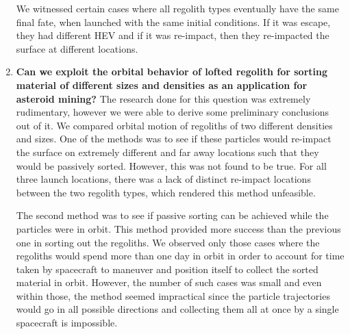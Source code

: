 \begin{enumerate}
We witnessed certain cases where all regolith types eventually have the same final fate, when launched with the same initial conditions. If it was escape, they had different \gls{HEV} and if it was re-impact, then they re-impacted the surface at different locations.

\item \textbf{Can we exploit the orbital behavior of lofted regolith for sorting material of different sizes and densities as an application for asteroid mining?}\newline
The research done for this question was extremely rudimentary, however we were able to derive some preliminary conclusions out of it. We compared orbital motion of regoliths of two different densities and sizes. One of the methods was to see if these particles would re-impact the surface on extremely different and far away locations such that they would be passively sorted. However, this was not found to be true. For all three launch locations, there was a lack of distinct re-impact locations between the two regolith types, which rendered this method unfeasible.

The second method was to see if passive sorting can be achieved while the particles were in orbit. This method provided more success than the previous one in sorting out the regoliths. We observed only those cases where the regoliths would spend more than one day in orbit in order to account for time taken by spacecraft to maneuver and position itself to collect the sorted material in orbit. However, the number of such cases was small and even within those, the method seemed impractical since the particle trajectories would go in all possible directions and collecting them all at once by a single spacecraft is impossible.

\end{enumerate}

